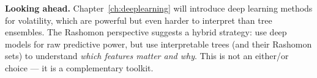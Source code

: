 \textbf{Looking ahead.}  Chapter~\ref{ch:deeplearning} will introduce deep
learning methods for volatility, which are powerful but even harder to
interpret than tree ensembles.  The Rashomon perspective suggests a hybrid
strategy: use deep models for raw predictive power, but use interpretable
trees (and their Rashomon sets) to understand \emph{which features matter
and why}.  This is not an either/or choice --- it is a complementary toolkit.
